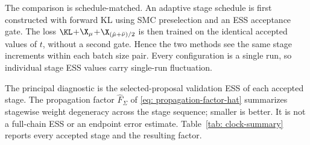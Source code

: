 \documentclass{article}
\begin{document}
The comparison is schedule-matched. An adaptive stage schedule is first constructed with forward KL using SMC preselection and an ESS acceptance gate. The loss $\KL$+$\X_\mu$+$\X_{(\hat\mu+\bar\nu)/2}$ is then trained on the identical accepted values of $t$, without a second gate. Hence the two methods see the same stage increments within each batch size pair. Every configuration is a single run, so individual stage ESS values carry single-run fluctuation.

The principal diagnostic is the selected-proposal validation ESS of each accepted stage. The propagation factor $\hat F_\Sigma$ of \eqref{eq: propagation-factor-hat} summarizes stagewise weight degeneracy across the stage sequence; smaller is better. It is not a full-chain ESS or an endpoint error estimate. Table~\ref{tab: clock-summary} reports every accepted stage and the resulting factor.
\end{document}
